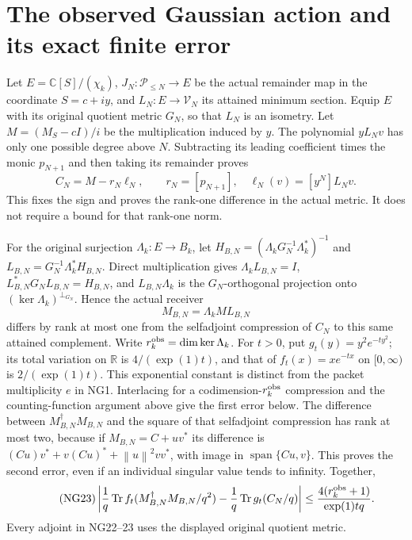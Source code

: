 \documentclass[11pt]{article}
\newcommand{\R}{\mathbb R}\newcommand{\C}{\mathbb C}
\newcommand{\PP}{\mathcal P}\newcommand{\dd}{\,d}
\newcommand{\norm}[1]{\left\lVert#1\right\rVert}
\newcommand{\Tr}{\operatorname{Tr}}\newcommand{\rank}{\operatorname{rank}}
\begin{document}
\section{The observed Gaussian action and its exact finite error}
Let $E=\C[S]/(\chi_k)$, $J_N:\PP_{\le N}\to E$ be the actual
remainder map in the coordinate $S=c+iy$, and $L_N:E\to\mathcal V_N$
its attained minimum section. Equip $E$ with its original quotient
metric $G_N$, so that $L_N$ is an isometry. Let
$M=(M_S-cI)/i$ be the multiplication induced by $y$.
The polynomial $yL_Nv$ has only one possible degree above $N$.
Subtracting its leading coefficient times the monic $p_{N+1}$ and
then taking its remainder proves
\begin{equation}\tag{NG21}
 C_N=M-r_N\ell_N,\qquad
 r_N=[p_{N+1}],\quad \ell_N(v)=[y^N]L_Nv.
\end{equation}
This fixes the sign and proves the rank-one difference in the actual
metric. It does not require a bound for that rank-one norm.

For the original surjection $\Lambda_k:E\to B_k$, let
$H_{B,N}=(\Lambda_kG_N^{-1}\Lambda_k^*)^{-1}$ and
$L_{B,N}=G_N^{-1}\Lambda_k^*H_{B,N}$. Direct multiplication gives
$\Lambda_kL_{B,N}=I$, $L_{B,N}^*G_NL_{B,N}=H_{B,N}$, and
$L_{B,N}\Lambda_k$ is the $G_N$-orthogonal projection onto
$(\ker\Lambda_k)^{\perp_{G_N}}$. Hence the actual receiver
\begin{equation}\tag{NG22}
 M_{B,N}=\Lambda_kML_{B,N}
\end{equation}
differs by rank at most one from the selfadjoint compression of $C_N$
to this same attained complement. Write $r_k^{\rm obs}=\dim\ker\Lambda_k$.
For $t>0$, put $g_t(y)=y^2e^{-ty^2}$; its total variation on $\R$ is
$4/(\exp(1)t)$, and that of $f_t(x)=xe^{-tx}$ on $[0,\infty)$ is
$2/(\exp(1)t)$. This exponential constant is distinct from the packet
multiplicity $e$ in NG1.
Interlacing for a codimension-$r_k^{\rm obs}$ compression and the
counting-function argument above give the first error below.
The difference between $M_{B,N}^{\dagger}M_{B,N}$ and the square of
that selfadjoint compression has rank at most two, because if
$M_{B,N}=C+uv^*$ its difference is
$(Cu)v^*+v(Cu)^*+\norm u^2vv^*$, with image in
$\operatorname{span}\{Cu,v\}$. This proves the second error, even if
an individual singular value tends to infinity. Together,
\begin{equation}\tag{NG23}
 \left|\frac1q\Tr f_t(M_{B,N}^{\dagger}M_{B,N}/q^2)
             -\frac1q\Tr g_t(C_N/q)\right|
 \le\frac{4(r_k^{\rm obs}+1)}{\exp(1)tq}.
\end{equation}
Every adjoint in NG22--23 uses the displayed original quotient metric.
\end{document}
